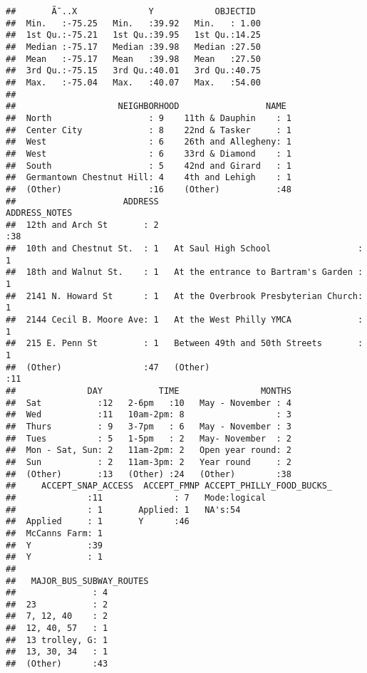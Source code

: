 \documentclass[]{article}
\begin{document}
\begin{verbatim}
##       Ã¯..X              Y            OBJECTID    
##  Min.   :-75.25   Min.   :39.92   Min.   : 1.00  
##  1st Qu.:-75.21   1st Qu.:39.95   1st Qu.:14.25  
##  Median :-75.17   Median :39.98   Median :27.50  
##  Mean   :-75.17   Mean   :39.98   Mean   :27.50  
##  3rd Qu.:-75.15   3rd Qu.:40.01   3rd Qu.:40.75  
##  Max.   :-75.04   Max.   :40.07   Max.   :54.00  
##                                                  
##                    NEIGHBORHOOD                 NAME   
##  North                   : 9    11th & Dauphin    : 1  
##  Center City             : 8    22nd & Tasker     : 1  
##  West                    : 6    26th and Allegheny: 1  
##  West                    : 6    33rd & Diamond    : 1  
##  South                   : 5    42nd and Girard   : 1  
##  Germantown Chestnut Hill: 4    4th and Lehigh    : 1  
##  (Other)                 :16    (Other)           :48  
##                     ADDRESS                                ADDRESS_NOTES
##  12th and Arch St       : 2                                       :38   
##  10th and Chestnut St.  : 1   At Saul High School                 : 1   
##  18th and Walnut St.    : 1   At the entrance to Bartram's Garden : 1   
##  2141 N. Howard St      : 1   At the Overbrook Presbyterian Church: 1   
##  2144 Cecil B. Moore Ave: 1   At the West Philly YMCA             : 1   
##  215 E. Penn St         : 1   Between 49th and 50th Streets       : 1   
##  (Other)                :47   (Other)                             :11   
##              DAY           TIME                MONTHS  
##  Sat           :12   2-6pm   :10   May - November : 4  
##  Wed           :11   10am-2pm: 8                  : 3  
##  Thurs         : 9   3-7pm   : 6   May - November : 3  
##  Tues          : 5   1-5pm   : 2   May- November  : 2  
##  Mon - Sat, Sun: 2   11am-2pm: 2   Open year round: 2  
##  Sun           : 2   11am-3pm: 2   Year round     : 2  
##  (Other)       :13   (Other) :24   (Other)        :38  
##     ACCEPT_SNAP_ACCESS  ACCEPT_FMNP ACCEPT_PHILLY_FOOD_BUCKS_
##              :11              : 7   Mode:logical             
##              : 1       Applied: 1   NA's:54                  
##  Applied     : 1       Y      :46                            
##  McCanns Farm: 1                                             
##  Y           :39                                             
##  Y           : 1                                             
##                                                              
##   MAJOR_BUS_SUBWAY_ROUTES
##               : 4        
##  23           : 2        
##  7, 12, 40    : 2        
##  12, 40, 57   : 1        
##  13 trolley, G: 1        
##  13, 30, 34   : 1        
##  (Other)      :43
\end{verbatim}
\end{document}
